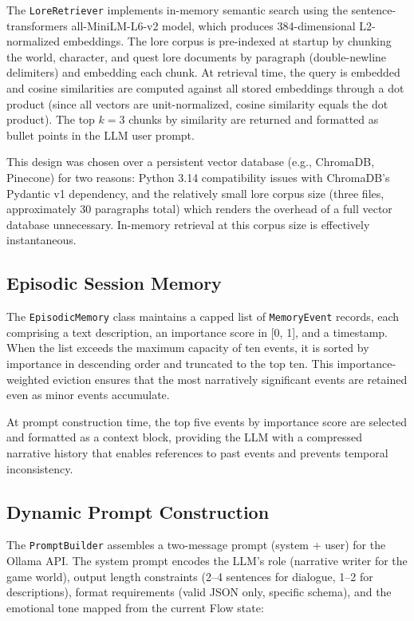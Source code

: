 \documentclass[12pt,a4paper]{report}
\begin{document}
The \texttt{LoreRetriever} implements in-memory semantic search using the sentence-transformers all-MiniLM-L6-v2 model, which produces 384-dimensional L2-normalized embeddings. The lore corpus is pre-indexed at startup by chunking the world, character, and quest lore documents by paragraph (double-newline delimiters) and embedding each chunk. At retrieval time, the query is embedded and cosine similarities are computed against all stored embeddings through a dot product (since all vectors are unit-normalized, cosine similarity equals the dot product). The top $k = 3$ chunks by similarity are returned and formatted as bullet points in the LLM user prompt.

This design was chosen over a persistent vector database (e.g., ChromaDB, Pinecone) for two reasons: Python 3.14 compatibility issues with ChromaDB's Pydantic v1 dependency, and the relatively small lore corpus size (three files, approximately 30 paragraphs total) which renders the overhead of a full vector database unnecessary. In-memory retrieval at this corpus size is effectively instantaneous.

\subsection{Episodic Session Memory}

The \texttt{EpisodicMemory} class maintains a capped list of \texttt{MemoryEvent} records, each comprising a text description, an importance score in [0, 1], and a timestamp. When the list exceeds the maximum capacity of ten events, it is sorted by importance in descending order and truncated to the top ten. This importance-weighted eviction ensures that the most narratively significant events are retained even as minor events accumulate.

At prompt construction time, the top five events by importance score are selected and formatted as a context block, providing the LLM with a compressed narrative history that enables references to past events and prevents temporal inconsistency.

\subsection{Dynamic Prompt Construction}

The \texttt{PromptBuilder} assembles a two-message prompt (system + user) for the Ollama API. The system prompt encodes the LLM's role (narrative writer for the game world), output length constraints (2--4 sentences for dialogue, 1--2 for descriptions), format requirements (valid JSON only, specific schema), and the emotional tone mapped from the current Flow state:
\end{document}
